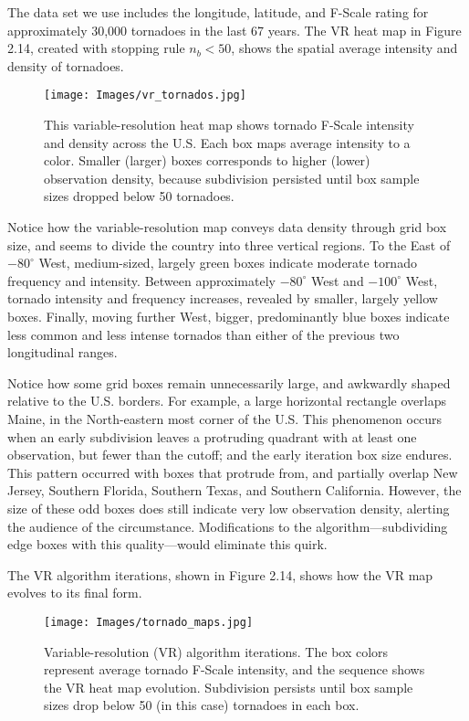 The data set we use includes the longitude, latitude, and F-Scale rating for approximately 30,000 tornadoes in the last 67 years. The VR heat map in Figure 2.14, created with stopping rule $n_{b} < 50$, shows the spatial average intensity and density of tornadoes.
        \begin{figure}[H]
      	\centering      
      	\texttt{[image: Images/vr\_tornados.jpg]}
      	\caption{This variable-resolution heat map shows tornado F-Scale intensity and density across the U.S. Each box maps average intensity to a color. Smaller (larger) boxes corresponds to higher (lower) observation density, because subdivision persisted until box sample sizes dropped below 50 tornadoes.}
        \end{figure}
Notice how the variable-resolution map conveys data density through grid box size, and seems to divide the country into three vertical regions. To the East of $-80^{\circ}$ West, medium-sized, largely green boxes indicate moderate tornado frequency and intensity. Between approximately $-80^{\circ}$ West and $-100^{\circ}$ West, tornado intensity and frequency increases, revealed by smaller, largely yellow boxes. Finally, moving further West, bigger, predominantly blue boxes indicate less common and less intense tornados than either of the previous two longitudinal ranges.

Notice how some grid boxes remain unnecessarily large, and awkwardly shaped relative to the U.S. borders. For example, a large horizontal rectangle overlaps Maine, in the North-eastern most corner of the U.S. This phenomenon occurs when an early subdivision leaves a protruding quadrant with at least one observation, but fewer than the cutoff; and the early iteration box size endures. This pattern occurred with boxes that protrude from, and partially overlap New Jersey, Southern Florida, Southern Texas, and Southern California. However, the size of these odd boxes does still indicate very low observation density, alerting the audience of the circumstance. Modifications to the algorithm---subdividing edge boxes with this quality---would eliminate this quirk.

The VR algorithm iterations, shown in Figure 2.14, shows how the VR map evolves to its final form.
        \begin{figure}[H]
      	\centering      
      	\texttt{[image: Images/tornado\_maps.jpg]}
      	\caption{Variable-resolution (VR) algorithm iterations. The box colors represent average tornado F-Scale intensity, and the sequence shows the VR heat map evolution. Subdivision persists until box sample sizes drop below 50 (in this case) tornadoes in each box.}
        \end{figure}


% 
% 
% 
% 